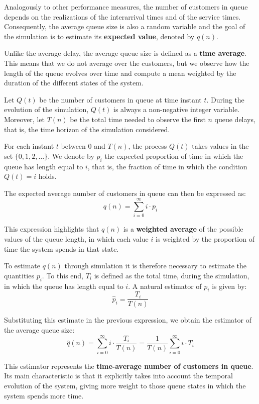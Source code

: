 Analogously to other performance measures, the number of customers in queue depends on the realizations of the interarrival times and of the service times. Consequently, the average queue size is also a random variable and the goal of the simulation is to estimate its \textbf{expected value}, denoted by $q(n)$.

Unlike the average delay, the average queue size is defined as a \textbf{time average}. This means that we do not average over the customers, but we observe how the length of the queue evolves over time and compute a mean weighted by the duration of the different states of the system.

Let $Q(t)$ be the number of customers in queue at time instant $t$. During the evolution of the simulation, $Q(t)$ is always a non-negative integer variable. Moreover, let $T(n)$ be the total time needed to observe the first $n$ queue delays, that is, the time horizon of the simulation considered.

For each instant $t$ between $0$ and $T(n)$, the process $Q(t)$ takes values in the set $\{0,1,2,\dots\}$. We denote by $p_i$ the expected proportion of time in which the queue has length equal to $i$, that is, the fraction of time in which the condition $Q(t) = i$ holds.

The expected average number of customers in queue can then be expressed as:
\[
q(n) = \sum_{i=0}^{\infty} i \cdot p_i
\]

This expression highlights that $q(n)$ is a \textbf{weighted average} of the possible values of the queue length, in which each value $i$ is weighted by the proportion of time the system spends in that state.

To estimate $q(n)$ through simulation it is therefore necessary to estimate the quantities $p_i$. To this end, $T_i$ is defined as the total time, during the simulation, in which the queue has length equal to $i$. A natural estimator of $p_i$ is given by:
\[
\hat{p}_i = \frac{T_i}{T(n)}
\]

Substituting this estimate in the previous expression, we obtain the estimator of the average queue size:
\[
\hat{q}(n) = \sum_{i=0}^{\infty} i \cdot \frac{T_i}{T(n)} = \frac{1}{T(n)} \sum_{i=0}^{\infty} i \cdot T_i
\]

This estimator represents the \textbf{time-average number of customers in queue}. Its main characteristic is that it explicitly takes into account the temporal evolution of the system, giving more weight to those queue states in which the system spends more time.

